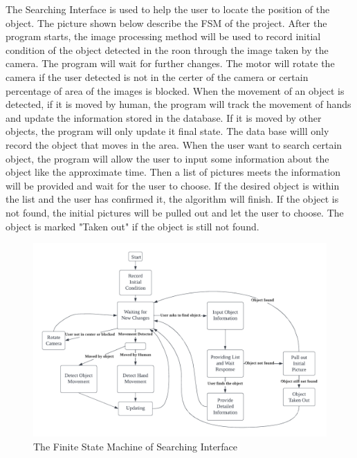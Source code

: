 \documentclass[12pt, titlepage]{article}
\begin{document}
The Searching Interface is used to help the user to locate the position of the object. The picture shown below describe the FSM of the project. After the program starts, the image processing method will be used to record initial condition of the object detected in the roon through the image taken by the camera. The program will wait for further changes. The motor will rotate the camera if the user detected is not in the certer of the camera or certain percentage of area of the images is blocked. When the movement of an object is detected, if it is moved by human, the program will track the movement of hands and update the information stored in the database. If it is moved by other objects, the program will only update it final state. The data base willl only record the object that moves in the area. When the user want to search certain object, the program will allow the user to input some information about the object like the approximate time. Then a list of pictures meets the information will be provided and wait for the user to choose. If the desired object is within the list and the user has confirmed it, the algorithm will finish. If the object is not found, the initial pictures will be pulled out and let the user to choose. The object is marked "Taken out" if the object is still not found. 

\begin{figure}[H]
    \centering
    \includegraphics[scale=0.8]{FSM.png}
    \caption{The Finite State Machine of Searching Interface}
\end{figure}
\end{document}
